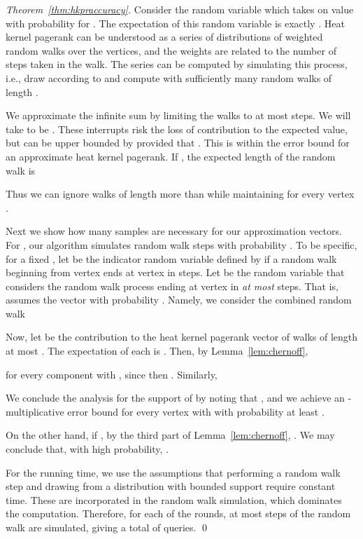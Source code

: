 \documentclass[runningheads,a4paper]{llncs}
\begin{document}
\begin{proof}[Theorem~\ref{thm:hkpraccuracy}]
Consider the random variable which takes on value  with probability  for .  The expectation of this random
variable is exactly .  Heat kernel pagerank can be understood as a series
of distributions of weighted random walks over the vertices, and the weights are
related to the number of steps taken in the walk.  The series can be computed by
simulating this process, i.e., draw  according to  and compute 
with sufficiently many random walks of length .

We approximate the infinite sum by limiting the walks to at most  steps.  We
will take  to be .  These interrupts risk the loss of
contribution to the expected value, but can be upper bounded by
 provided that .
This is within the error bound for an approximate heat kernel pagerank.  If , the expected length of the random walk is

Thus we can ignore walks of length more than  while maintaining  for every vertex .

Next we show how many samples are necessary for our approximation vectors.  For
, our algorithm simulates  random walk steps with probability
.  To be specific, for a fixed , let  be the
indicator random variable defined by  if a random walk beginning from
vertex  ends at vertex  in  steps.  Let  be the random variable
that considers the random walk process ending at vertex  in \emph{at most}
 steps.  That is,  assumes the vector  with probability
.  Namely, we consider the combined random walk


Now, let  be the contribution to the heat kernel pagerank vector
 of walks of length at most .  The expectation of each  is
.  Then, by Lemma~\ref{lem:chernoff},

for every component with , since then .  Similarly,

We conclude the analysis for the support of  by noting that , and we achieve an -multiplicative error bound for
every vertex  with  with probability at least
.

On the other hand, if , by the third part of
Lemma~\ref{lem:chernoff}, .  We may conclude that, with high probability, .

For the running time, we use the assumptions that performing a random walk step
and drawing from a distribution with bounded support require constant time.
These are incorporated in the random walk simulation, which dominates the
computation.  Therefore, for each of the  rounds, at most  steps of the
random walk are simulated, giving a total of  queries.
\qed\end{proof}
\end{document}
